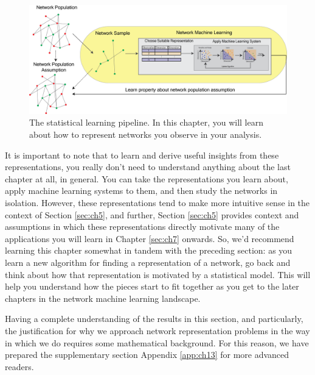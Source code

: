 \begin{figure}[h]
    \centering
    \includegraphics[width=\linewidth]{representations/ch6/Images/network_reps.png}
    \caption[Representation learning schematic]{The statistical learning pipeline. In this chapter, you will learn about how to represent networks you observe in your analysis.}
    \label{fig:ch6:netrep}
\end{figure}

It is important to note that to learn and derive useful insights from these representations, you really don't need to understand anything about the last chapter at {all}, in general. You can take the representations you learn about, apply machine learning systems to them, and then study the networks in isolation. However, these representations tend to make more intuitive sense in the context of Section \ref{sec:ch5}, and further, Section \ref{sec:ch5} provides context and assumptions in which these representations directly motivate many of the applications you will learn in Chapter \ref{sec:ch7} onwards. So, we'd recommend learning this chapter somewhat in tandem with the preceding section: as you learn a new algorithm for finding a representation of a network, go back and think about how that representation is motivated by a statistical model. This will help you understand how the pieces start to fit together as you get to the later chapters in the network machine learning landscape.

Having a complete understanding of the results in this section, and particularly, the justification for {why} we approach network representation problems in the way in which we do requires some mathematical background. For this reason, we have prepared the supplementary section Appendix \ref{app:ch13} for more advanced readers.











